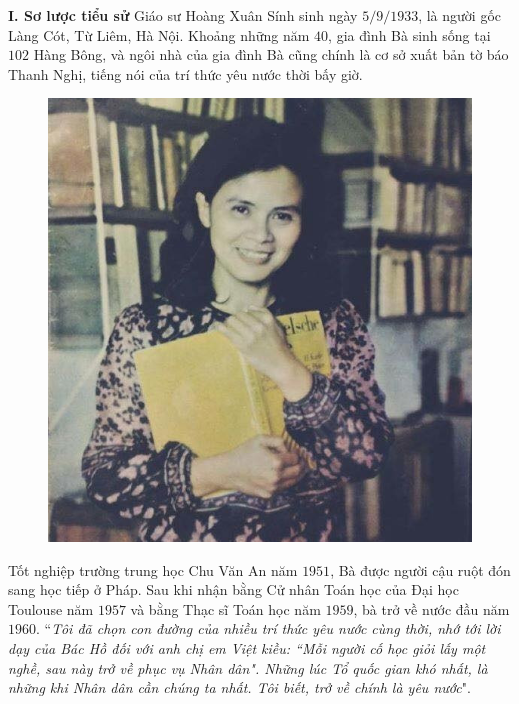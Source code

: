 \begin{multicols}{2}
	\textbf{\color{doisongtoanhoc}I. Sơ lược tiểu sử}
	\vskip 0.1cm
	Giáo sư Hoàng Xuân Sính sinh ngày $5/9/1933$, là người gốc Làng Cót, Từ Liêm, Hà Nội. Khoảng những năm $40$, gia đình Bà sinh sống tại $102$ Hàng Bông, và ngôi nhà của gia đình Bà cũng chính là cơ sở xuất bản tờ báo Thanh Nghị, tiếng nói của trí thức yêu nước thời bấy giờ.
	\begin{figure}[H]
		\vspace*{-5pt}
		\centering
		\captionsetup{labelformat= empty, justification=centering}
		\includegraphics[width= 1\linewidth]{Anh1}
		\vspace*{-15pt}
	\end{figure}
	Tốt nghiệp trường trung học Chu Văn An năm $1951$, Bà được người cậu ruột đón sang học tiếp ở Pháp. Sau khi nhận bằng Cử nhân Toán học của Đại học Toulouse năm $1957$ và bằng Thạc sĩ Toán học năm $1959$, bà trở về nước đầu năm $1960$.
	\vskip 0.1cm
	``\textit{Tôi đã chọn con đường của nhiều trí thức yêu nước cùng thời, nhớ tới lời dạy của Bác Hồ đối với anh chị em Việt kiều: ``Mỗi người cố học giỏi lấy một nghề, sau này trở về phục vụ Nhân dân". Những lúc Tổ quốc gian khó nhất, là những khi Nhân dân cần chúng ta nhất. Tôi biết, trở về chính là yêu nước}".

\end{multicols}
